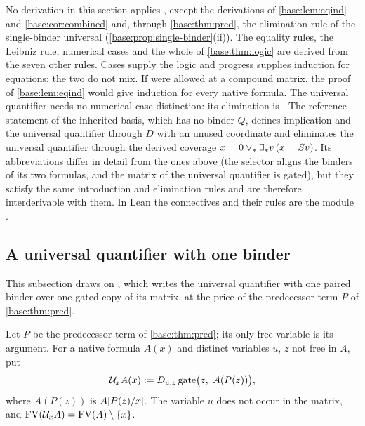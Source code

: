 \begin{remark}
\label{base:rem:noprogress}
No derivation in this section applies , except the derivations
of \cref{base:lem:eqind} and \cref{base:cor:combined} and, through
\cref{base:thm:pred}, the elimination rule of the single-binder universal
(\cref{base:prop:single-binder}(ii)).  The equality rules,
the Leibniz rule, numerical cases and the whole of \cref{base:thm:logic} are
derived from the seven other rules.  Cases supply the logic and progress
supplies induction for equations; the two do not mix.  If 
were allowed at a compound matrix, the proof of \cref{base:lem:eqind} would
give induction for every native formula.  The universal quantifier needs no
numerical case distinction: its elimination is .  The
reference statement of the inherited basis, which has no binder $Q$,
defines implication and the universal quantifier through $D$ with an
unused coordinate and eliminates the universal quantifier through the
derived coverage $x=0\vee_*\exists_* v\,(x=S v)$.  Its abbreviations
differ in detail from the ones above (the selector aligns the binders of its
two formulas, and the matrix of the universal quantifier is gated), but they
satisfy the same introduction and elimination rules and are therefore
interderivable with them.
In Lean the connectives and their rules are the module .
\end{remark}

\subsection{A universal quantifier with one binder}
\label{base:sec:single-binder}

This subsection draws on , which writes the universal
quantifier with one paired binder over one gated copy of its matrix, at the
price of the predecessor term $P$ of \cref{base:thm:pred}.

\begin{definition}
\label{base:def:single-binder}
Let $P$ be the predecessor term of \cref{base:thm:pred}; its only free
variable is its argument.  For a native formula $A(x)$ and distinct
variables $u$, $z$ not free in $A$, put
\[
 \mathcal U_x A(x)\mathrel{:=}
 D_{u,z}\operatorname{gate}\bigl(z,\ A(P(z))\bigr),
\]
where $A(P(z))$ is $A[P(z)/x]$.  The variable $u$ does not occur in
the matrix, and $\operatorname{FV}(\mathcal U_xA)=\operatorname{FV}(A)\setminus\{x\}$.
\end{definition}

